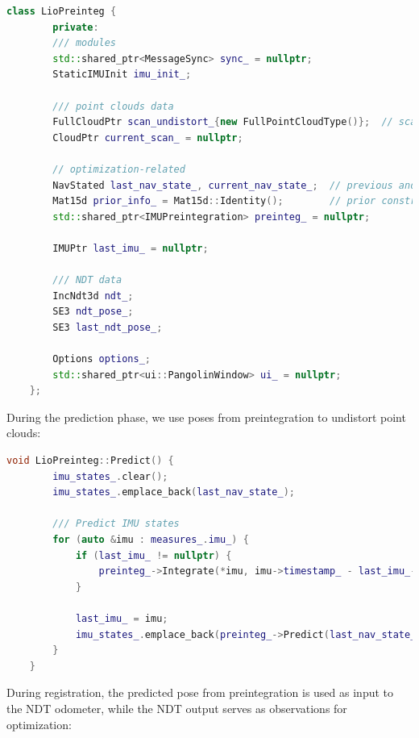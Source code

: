 \begin{lstlisting}[language=c++,caption=src/ch8/lio-preinteg/lio_preinteg.h]
	class LioPreinteg {
		private:
		/// modules
		std::shared_ptr<MessageSync> sync_ = nullptr;
		StaticIMUInit imu_init_;
		
		/// point clouds data
		FullCloudPtr scan_undistort_{new FullPointCloudType()};  // scan after undistortion
		CloudPtr current_scan_ = nullptr;
		
		// optimization-related
		NavStated last_nav_state_, current_nav_state_;  // previous and current states  
		Mat15d prior_info_ = Mat15d::Identity();        // prior constraint
		std::shared_ptr<IMUPreintegration> preinteg_ = nullptr;
		
		IMUPtr last_imu_ = nullptr;
		
		/// NDT data
		IncNdt3d ndt_;
		SE3 ndt_pose_;
		SE3 last_ndt_pose_;
		
		Options options_;
		std::shared_ptr<ui::PangolinWindow> ui_ = nullptr;
	};
\end{lstlisting}

During the prediction phase, we use poses from preintegration to undistort point clouds:

\begin{lstlisting}[language=c++,caption=src/ch8/lio-preinteg/lio_preinteg.cc]
	void LioPreinteg::Predict() {
		imu_states_.clear();
		imu_states_.emplace_back(last_nav_state_);
		
		/// Predict IMU states
		for (auto &imu : measures_.imu_) {
			if (last_imu_ != nullptr) {
				preinteg_->Integrate(*imu, imu->timestamp_ - last_imu_->timestamp_);
			}
			
			last_imu_ = imu;
			imu_states_.emplace_back(preinteg_->Predict(last_nav_state_, imu_init_.GetGravity()));
		}
	}
\end{lstlisting}

During registration, the predicted pose from preintegration is used as input to the NDT odometer, while the NDT output serves as observations for optimization:

